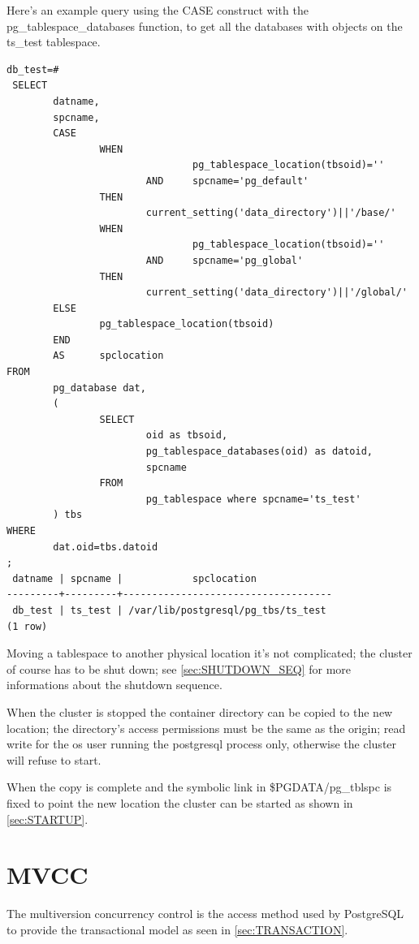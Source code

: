Here's an example query using the CASE construct with the pg\_tablespace\_databases function, to 
get 
all the databases with objects on the ts\_test tablespace.\newpage
\begin{lstlisting}[style=pgsql]
 db_test=# 
 SELECT
        datname,
        spcname,
        CASE
                WHEN 
                                pg_tablespace_location(tbsoid)=''
                        AND     spcname='pg_default'
                THEN
                        current_setting('data_directory')||'/base/'
                WHEN 
                                pg_tablespace_location(tbsoid)=''
                        AND     spcname='pg_global'
                THEN
                        current_setting('data_directory')||'/global/'
        ELSE
                pg_tablespace_location(tbsoid)
        END
        AS      spclocation
FROM
        pg_database dat,
        (
                SELECT
                        oid as tbsoid,
                        pg_tablespace_databases(oid) as datoid,
                        spcname 
                FROM 
                        pg_tablespace where spcname='ts_test'
        ) tbs
WHERE
        dat.oid=tbs.datoid
;
 datname | spcname |            spclocation             
---------+---------+------------------------------------
 db_test | ts_test | /var/lib/postgresql/pg_tbs/ts_test
(1 row)

\end{lstlisting}

Moving a tablespace to another physical location it's not complicated; the cluster of course has to 
be shut down; see \ref{sec:SHUTDOWN_SEQ} for more informations about the shutdown sequence.\newline

When the cluster is stopped the container directory can be copied to the new location; the 
directory's access permissions must be the same as the origin; read write for the os user running 
the postgresql process only, otherwise the cluster will refuse to start.\newline

When the copy is complete and the symbolic link in \$PGDATA/pg\_tblspc is fixed to point the new 
location the cluster can be started as shown in \ref{sec:STARTUP}.

\section{MVCC} \label{sec:MVCC} 
The multiversion concurrency control is the access method used by PostgreSQL to provide the 
transactional model as seen in \ref{sec:TRANSACTION}.\newline

